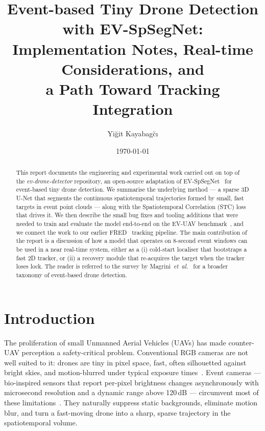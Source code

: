 \documentclass[11pt,a4paper]{article}
\title{Event-based Tiny Drone Detection with EV-SpSegNet:\\
       Implementation Notes, Real-time Considerations, and \\
       a Path Toward Tracking Integration}
\author{Yi\u{g}it Kayabag\u{c}\i}
\date{\today}
\begin{document}
\maketitle

\begin{abstract}
This report documents the engineering and experimental work carried
out on top of the \emph{ev-drone-detector} repository, an open-source
adaptation of EV-SpSegNet~\cite{chen2025evspsegnet} for event-based
tiny drone detection. We summarise the underlying method --- a sparse
3D U-Net that segments the continuous spatiotemporal trajectories
formed by small, fast targets in event point clouds --- along with the
Spatiotemporal Correlation (STC) loss that drives it. We then describe
the small bug fixes and tooling additions that were needed to train
and evaluate the model end-to-end on the EV-UAV
benchmark~\cite{chen2025evspsegnet}, and we connect the work to our
earlier FRED~\cite{magrini2025fred} tracking pipeline. The main
contribution of the report is a discussion of how a model that
operates on 8-second event windows can be used in a near real-time
system, either as a (i) cold-start localiser that bootstraps a fast
2D tracker, or (ii) a recovery module that re-acquires the target
when the tracker loses lock. The reader is referred to the survey by
Magrini~\textit{et~al.}~\cite{magrini2025survey} for a broader
taxonomy of event-based drone detection.
\end{abstract}

\section{Introduction}
The proliferation of small Unmanned Aerial Vehicles (UAVs) has made
counter-UAV perception a safety-critical problem. Conventional RGB
cameras are not well suited to it: drones are tiny in pixel space,
fast, often silhouetted against bright skies, and motion-blurred
under typical exposure times~\cite{magrini2025survey}. Event
cameras --- bio-inspired sensors that report per-pixel brightness
changes asynchronously with microsecond resolution and a dynamic
range above 120\,dB --- circumvent most of these
limitations~\cite{gallego2020eventsurvey}. They naturally suppress
static backgrounds, eliminate motion blur, and turn a fast-moving
drone into a sharp, sparse trajectory in the spatiotemporal volume.
\end{document}
